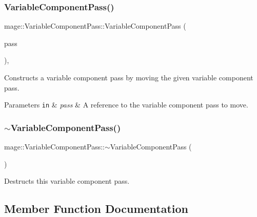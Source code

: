 \subsubsection{\texorpdfstring{Variable\+Component\+Pass()}{VariableComponentPass()}\hspace{0.1cm}{\footnotesize\ttfamily [3/3]}}
{\footnotesize\ttfamily mage\+::\+Variable\+Component\+Pass\+::\+Variable\+Component\+Pass (\begin{DoxyParamCaption}\item[{\hyperlink{classmage_1_1_variable_component_pass}{Variable\+Component\+Pass} \&\&}]{pass }\end{DoxyParamCaption})\hspace{0.3cm}{\ttfamily [default]}, {\ttfamily [noexcept]}}

Constructs a variable component pass by moving the given variable component pass.


\begin{DoxyParams}[1]{Parameters}
\mbox{\tt in}  & {\em pass} & A reference to the variable component pass to move. \\
\hline
\end{DoxyParams}
\hypertarget{classmage_1_1_variable_component_pass_addf03c307a88e6a1871f0ec3adbb8bcb}{}\label{classmage_1_1_variable_component_pass_addf03c307a88e6a1871f0ec3adbb8bcb} 
\subsubsection{\texorpdfstring{$\sim$\+Variable\+Component\+Pass()}{~VariableComponentPass()}}
{\footnotesize\ttfamily mage\+::\+Variable\+Component\+Pass\+::$\sim$\+Variable\+Component\+Pass (\begin{DoxyParamCaption}{ }\end{DoxyParamCaption})\hspace{0.3cm}{\ttfamily [default]}}

Destructs this variable component pass. 

\subsection{Member Function Documentation}
\hypertarget{classmage_1_1_variable_component_pass_ab3c2536fd9633f61309d649d68373813}{}\label{classmage_1_1_variable_component_pass_ab3c2536fd9633f61309d649d68373813} 
